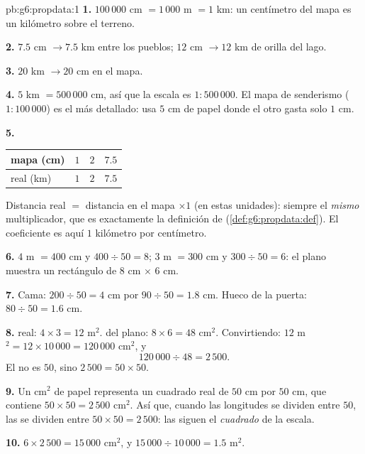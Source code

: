 \begin{solution}{pb:g6:propdata:1}
\textbf{1.} $100\,000$ cm $= 1\,000$ m $= 1$ km: un centímetro
del mapa es un kilómetro sobre el terreno.

\textbf{2.} $7.5$ cm $\rightarrow 7.5$ km entre los pueblos;
$12$ cm $\rightarrow 12$ km de orilla del lago.

\textbf{3.} $20$ km $\rightarrow 20$ cm en el mapa.

\textbf{4.} $5$ km $= 500\,000$ cm, así que la escala es
$1:500\,000$. El mapa de senderismo ($1:100\,000$) es el más
detallado: usa $5$ cm de papel donde el otro gasta solo
$1$ cm.

\textbf{5.}
\begin{center}
\renewcommand{\arraystretch}{1.2}
\begin{tabular}{l|ccc}
mapa (cm) & $1$ & $2$ & $7.5$ \\
\hline
real (km) & $1$ & $2$ & $7.5$ \\
\end{tabular}
\end{center}
Distancia real $=$ distancia en el mapa $\times 1$ (en estas unidades):
siempre el \emph{mismo} multiplicador, que es exactamente la
definición de 
(\cref{def:g6:propdata:def}). El coeficiente es aquí $1$
kilómetro por centímetro.

\textbf{6.} $4$ m $= 400$ cm y $400 \div 50 = 8$;
$3$ m $= 300$ cm y $300 \div 50 = 6$: el plano muestra un
rectángulo de $8$ cm $\times$ $6$ cm.

\textbf{7.} Cama: $200 \div 50 = 4$ cm por $90 \div 50 = 1.8$ cm.
Hueco de la puerta: $80 \div 50 = 1.6$ cm.

\textbf{8.}  real: $4 \times 3 = 12$ m$^2$.  del plano:
$8 \times 6 = 48$ cm$^2$. Convirtiendo:
$12$ m$^2 = 12 \times 10\,000 = 120\,000$ cm$^2$, y
\[
120\,000 \div 48 = 2\,500 .
\]
El  no es $50$, sino $2\,500 = 50 \times 50$.

\textbf{9.} Un cm$^2$ de papel representa un cuadrado real de
$50$ cm por $50$ cm, que contiene
$50 \times 50 = 2\,500$ cm$^2$. Así que, cuando las longitudes se dividen entre
$50$, las  se dividen entre $50 \times 50 = 2\,500$: las  siguen
el \emph{cuadrado} de la escala.

\textbf{10.} $6 \times 2\,500 = 15\,000$ cm$^2$, y
$15\,000 \div 10\,000 = 1.5$ m$^2$.


\end{solution}
